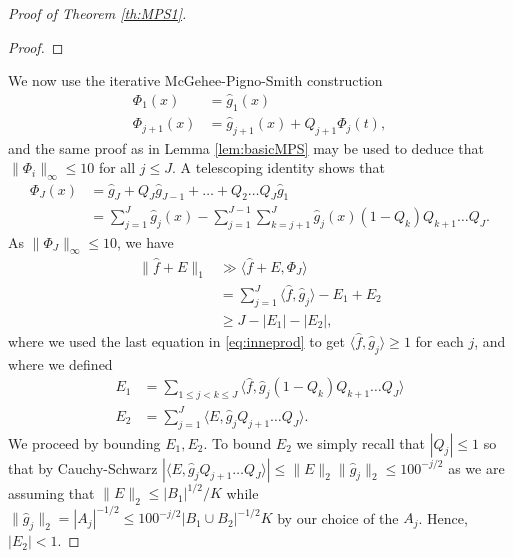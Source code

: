 \documentclass[11pt, reqno]{amsart}
\begin{document}
\begin{proof}[Proof of Theorem \ref{th:MPS1}]
\begin{proof}
\end{proof}
We now use the iterative McGehee-Pigno-Smith construction
\begin{align*}
    \Phi_1(x)&=\hat{g}_1(x)\\
    \Phi_{j+1}(x)&=\hat{g}_{j+1}(x)+Q_{j+1}\Phi_j(t),
\end{align*}
and the same proof as in Lemma \ref{lem:basicMPS} may be used to deduce that $\lVert \Phi_i\rVert_\infty\leqslant 10$ for all $j\leqslant J$. A telescoping identity shows that
\begin{align*}\Phi_J(x)&=\hat{g}_J+Q_J\hat{g}_{J-1}+\dots+Q_2\dots Q_J\hat{g}_1\\
&=\sum_{j=1}^J\hat{g}_j(x)-\sum_{j=1}^{J-1}\sum_{k=j+1}^J\hat{g}_j(x)(1-Q_k)Q_{k+1}\dots Q_J.
\end{align*}
As $\lVert \Phi_J\rVert_\infty\leqslant 10$, we have
\begin{align}
    \lVert \hat{f} + E\rVert_1&\gg \langle \hat{f} +E,\Phi_J\rangle\nonumber\\
    &= \sum_{j=1}^J\langle \hat{f}, \hat{g}_j\rangle-E_1+E_2\nonumber\\
    &\geqslant J-|E_1|-|E_2|,\label{J,Eboundenergy}
\end{align}
where we used the last equation in \eqref{eq:inneprod} to get $\langle \hat{f}, \hat{g}_j\rangle\geqslant 1$ for each $j$, and where we defined \begin{align*}E_1&=\sum_{1\leqslant j<k\leqslant J}\langle \hat{f}, \hat{g}_j(1-Q_{k})Q_{k+1}\dots Q_{J}\rangle\\
E_2&= \sum_{j=1}^J\langle E, \hat{g}_jQ_{j+1}\dots Q_J\rangle.
\end{align*} We proceed by bounding $E_1, E_2$. To bound $E_2$ we simply recall that $|Q_j|\leqslant 1$ so that by Cauchy-Schwarz $|\langle E, \hat{g}_j Q_{j+1}\dots Q_J\rangle| \leqslant \lVert E\rVert_2 \lVert \hat{g}_j\rVert_2\leqslant100^{-j/2}$ as we are assuming that $\lVert E\rVert_2\leqslant |B_1|^{1/2}/K$ while $\lVert \hat{g}_j\rVert_2=|A_j|^{-1/2}\leqslant 100^{-j/2}|B_1\cup B_2|^{-1/2}K$ by our choice of the $A_j$. Hence, $|E_2|<1$.

\medskip


\end{proof}
\end{document}
